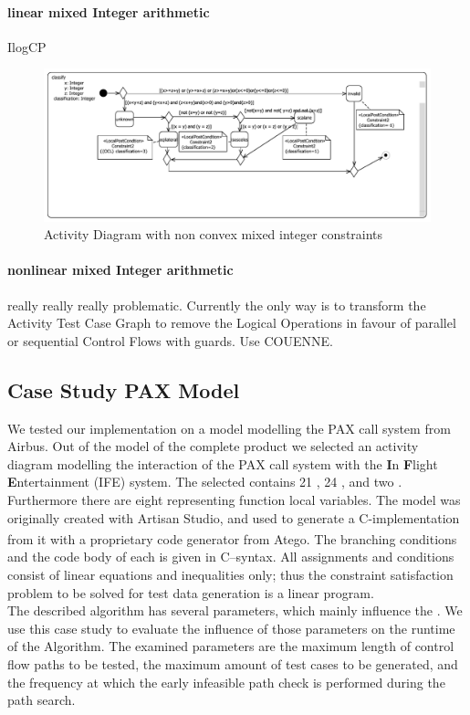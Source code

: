\paragraph{linear mixed Integer arithmetic} IlogCP
\begin{figure}
\label{fig:classifyTriangle}
\includegraphics[width=\textwidth]{./pics/TriangleClassificator.pdf}
\caption{Activity Diagram with non convex mixed integer constraints}
\end{figure}
\paragraph{nonlinear mixed Integer arithmetic}
really really really problematic. Currently the only way is to transform the Activity Test Case Graph to remove the Logical Operations in favour of parallel or sequential Control Flows with guards. Use COUENNE.
\subsection{Case Study PAX Model}
\label{sec:evaluationCaseStudy}
We tested our implementation on a model modelling the PAX call system from Airbus. Out of the model of the complete product we selected an activity diagram modelling the interaction of the PAX call system with the \textbf{I}n \textbf{F}light \textbf{E}ntertainment (IFE) system. The selected  contains 21 , 24 , and two . Furthermore there are eight  representing function local variables. The model was originally created with Artisan Studio, and used to generate a C-implementation from it with a proprietary code generator from Atego\textsuperscript{\textregistered}. The branching conditions and the code body of each  is given in C--syntax. All assignments and conditions consist of linear equations and inequalities only; thus the constraint satisfaction problem to be solved for test data generation is a linear program.\\
The described algorithm has several parameters, which mainly influence the . We use this case study to evaluate the influence of those parameters on the runtime of the Algorithm. The examined parameters are the maximum length of control flow paths to be tested, the maximum amount of test cases to be generated, and the frequency at which the early infeasible path check is performed during the path search.
